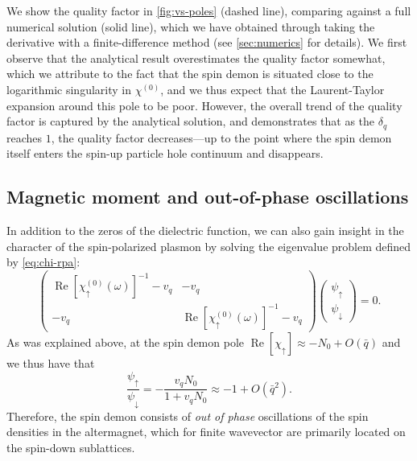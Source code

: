 \documentclass[aps,prb,reprint,twocolumns,superscriptaddress,nofootinbib]{revtex4-2}
\DeclareMathOperator{\Ree}{Re}
\begin{document}
	We show the quality factor in \cref{fig:vs-poles} (dashed line), comparing against a full numerical solution (solid line), which we have obtained through taking the derivative with a finite-difference method (see \cref{sec:numerics} for details). We first observe that the analytical result overestimates the quality factor somewhat, which we attribute to the fact that the spin demon is situated close to the logarithmic singularity in $\chi^{(0)}$, and we thus expect that the Laurent-Taylor expansion around this pole to be poor. However, the overall trend of the quality factor is captured by the analytical solution, and demonstrates that as the $\delta_q$ reaches $1$, the quality factor decreases---up to the point where the spin demon itself enters the spin-up particle hole continuum and disappears.
	
	
	\subsection{Magnetic moment and out-of-phase oscillations}
	In addition to the zeros of the dielectric function, we can also gain insight in the character of the spin-polarized plasmon by solving the eigenvalue problem defined by \cref{eq:chi-rpa}:
	\begin{equation}
		\begin{pmatrix}
			\Ree[\chi_{\uparrow}^{(0)}(\omega)]^{-1}-v_q & -v_q \\
			-v_q & \Ree[\chi_{\uparrow}^{(0)}(\omega)]^{-1}-v_q
		\end{pmatrix}\begin{pmatrix}
			\psi_\uparrow \\ \psi_\downarrow
		\end{pmatrix} =0.
	\end{equation}
	As was explained above, at the spin demon pole $\Ree[\chi_\uparrow]\approx-N_0 + O(\bar q)$ and we thus have that 
	\begin{equation}
		\frac{\psi_\uparrow}{\psi_\downarrow} = -\frac{v_qN_0}{1 + v_qN_0}\approx -1 + O(\bar q^2).
	\end{equation}
	Therefore, the spin demon consists of \emph{out of phase} oscillations of the spin densities in the altermagnet, which for finite wavevector are primarily located on the spin-down sublattices.
	
\end{document}
